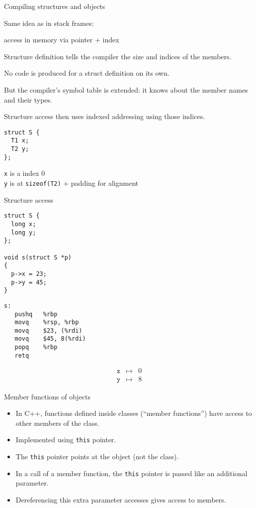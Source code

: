 \documentclass[landscape]{beamer}
\begin{document}
\begin{frame}[fragile]{Compiling structures and objects}

Same idea as in stack frames:

access in memory via
pointer + index

Structure \alert{definition} tells the compiler the size and indices of the members.

No code is produced for a struct definition on its own. 

But the compiler's symbol table is extended: it knows about the member names and their types.

Structure \alert{access} then uses indexed addressing using those indices.

\begin{verbatim}
struct S {
  T1 x;
  T2 y;
};
\end{verbatim}
\pause
\texttt x is a index 0\\
 \texttt y is at \texttt{sizeof(T2)} + padding for alignment
\end{frame}

\begin{frame}[fragile]{Structure access}
\begin{minipage}{.5\textwidth}
\begin{verbatim}
struct S {
  long x;
  long y;
};

void s(struct S *p)
{
  p->x = 23;
  p->y = 45;
}
\end{verbatim}
\end{minipage}
%
\begin{minipage}{.45\textwidth}
\begin{verbatim}
s:      
   pushq   %rbp
   movq    %rsp, %rbp
   movq    $23, (%rdi)
   movq    $45, 8(%rdi)
   popq    %rbp
   retq
\end{verbatim}
\end{minipage}
\begin{eqnarray*}
\texttt x&\mapsto& 0
\\
\texttt y&\mapsto& 8
\end{eqnarray*}
\end{frame}


\begin{frame}{Member functions of objects}

\begin{itemize}
\item
In C++, functions defined inside classes (``member functions'') have access to other members of the class.
\item
Implemented using \texttt{this} pointer.
\item
The \texttt{this} pointer points at the object (not the class).
\item
In a call of a member function, the \texttt{this} pointer is passed like an additional parameter.
\item
Dereferencing this extra parameter accesses gives access to members.
\end{itemize}

\end{frame}
\end{document}
